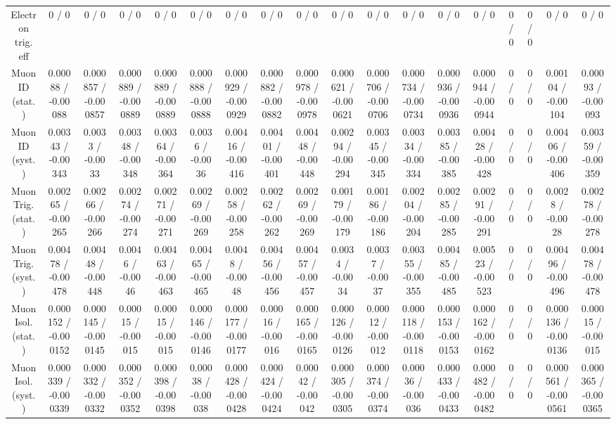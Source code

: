 \documentclass[10pt]{article}
\begin{document}
\begin{table}[htbp]
\begin{center}
\begin{tabular}{|c|c|c|c|c|c|c|c|c|c|c|c|c|c|c|c|c|c|}
  Electron trig. eff & 0 / 0 & 0 / 0 & 0 / 0 & 0 / 0 & 0 / 0 & 0 / 0 & 0 / 0 & 0 / 0 & 0 / 0 & 0 / 0 & 0 / 0 & 0 / 0 & 0 / 0 & 0 / 0 & 0 / 0 & 0 / 0 & 0 / 0 \\ 
  Muon ID (stat.) & 0.00088 / -0.00088 & 0.000857 / -0.000857 & 0.000889 / -0.000889 & 0.000889 / -0.000889 & 0.000888 / -0.000888 & 0.000929 / -0.000929 & 0.000882 / -0.000882 & 0.000978 / -0.000978 & 0.000621 / -0.000621 & 0.000706 / -0.000706 & 0.000734 / -0.000734 & 0.000936 / -0.000936 & 0.000944 / -0.000944 & 0 / 0 & 0 / 0 & 0.00104 / -0.00104 & 0.00093 / -0.00093 \\ 
  Muon ID (syst.) & 0.00343 / -0.00343 & 0.0033 / -0.0033 & 0.00348 / -0.00348 & 0.00364 / -0.00364 & 0.0036 / -0.0036 & 0.00416 / -0.00416 & 0.00401 / -0.00401 & 0.00448 / -0.00448 & 0.00294 / -0.00294 & 0.00345 / -0.00345 & 0.00334 / -0.00334 & 0.00385 / -0.00385 & 0.00428 / -0.00428 & 0 / 0 & 0 / 0 & 0.00406 / -0.00406 & 0.00359 / -0.00359 \\ 
  Muon Trig. (stat.) & 0.00265 / -0.00265 & 0.00266 / -0.00266 & 0.00274 / -0.00274 & 0.00271 / -0.00271 & 0.00269 / -0.00269 & 0.00258 / -0.00258 & 0.00262 / -0.00262 & 0.00269 / -0.00269 & 0.00179 / -0.00179 & 0.00186 / -0.00186 & 0.00204 / -0.00204 & 0.00285 / -0.00285 & 0.00291 / -0.00291 & 0 / 0 & 0 / 0 & 0.0028 / -0.0028 & 0.00278 / -0.00278 \\ 
  Muon Trig. (syst.) & 0.00478 / -0.00478 & 0.00448 / -0.00448 & 0.0046 / -0.0046 & 0.00463 / -0.00463 & 0.00465 / -0.00465 & 0.0048 / -0.0048 & 0.00456 / -0.00456 & 0.00457 / -0.00457 & 0.0034 / -0.0034 & 0.0037 / -0.0037 & 0.00355 / -0.00355 & 0.00485 / -0.00485 & 0.00523 / -0.00523 & 0 / 0 & 0 / 0 & 0.00496 / -0.00496 & 0.00478 / -0.00478 \\ 
  Muon Isol. (stat.) & 0.000152 / -0.000152 & 0.000145 / -0.000145 & 0.00015 / -0.00015 & 0.00015 / -0.00015 & 0.000146 / -0.000146 & 0.000177 / -0.000177 & 0.00016 / -0.00016 & 0.000165 / -0.000165 & 0.000126 / -0.000126 & 0.00012 / -0.00012 & 0.000118 / -0.000118 & 0.000153 / -0.000153 & 0.000162 / -0.000162 & 0 / 0 & 0 / 0 & 0.000136 / -0.000136 & 0.00015 / -0.00015 \\ 
  Muon Isol. (syst.) & 0.000339 / -0.000339 & 0.000332 / -0.000332 & 0.000352 / -0.000352 & 0.000398 / -0.000398 & 0.00038 / -0.00038 & 0.000428 / -0.000428 & 0.000424 / -0.000424 & 0.00042 / -0.00042 & 0.000305 / -0.000305 & 0.000374 / -0.000374 & 0.00036 / -0.00036 & 0.000433 / -0.000433 & 0.000482 / -0.000482 & 0 / 0 & 0 / 0 & 0.000561 / -0.000561 & 0.000365 / -0.000365 \\ 

\end{tabular}
\end{center}
\end{table}
\end{document}

